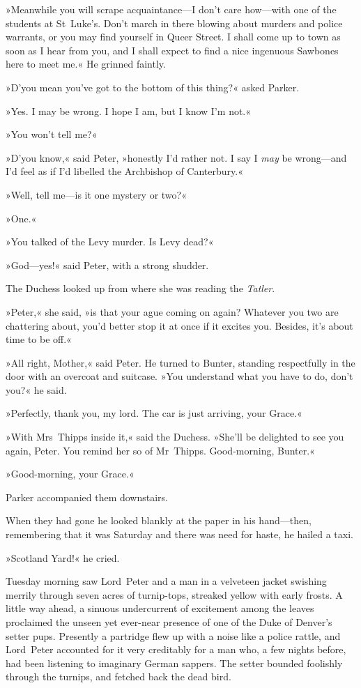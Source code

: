 »Meanwhile you will scrape acquaintance—I don't care how—with one of the students at St~Luke's. Don't march in there blowing about murders and police warrants, or you may find yourself in Queer Street. I shall come up to town as soon as I hear from you, and I shall expect to find a nice ingenuous Sawbones here to meet me.« He grinned faintly.

»D'you mean you've got to the bottom of this thing?« asked Parker.

»Yes. I may be wrong. I hope I am, but I know I'm not.«

»You won't tell me?«

»D'you know,« said Peter, »honestly I'd rather not. I say I \textit{may} be wrong—and I'd feel as if I'd libelled the Archbishop of Canterbury.«

»Well, tell me—is it one mystery or two?«

»One.«

»You talked of the Levy murder. Is Levy dead?«

»God—yes!« said Peter, with a strong shudder.

The Duchess looked up from where she was reading the \textit{Tatler}.

»Peter,« she said, »is that your ague coming on again? Whatever you two are chattering about, you'd better stop it at once if it excites you. Besides, it's about time to be off.«

»All right, Mother,« said Peter. He turned to Bunter, standing respectfully in the door with an overcoat and suitcase. »You understand what you have to do, don't you?« he said.

»Perfectly, thank you, my lord. The car is just arriving, your Grace.«

»With Mrs~Thipps inside it,« said the Duchess. »She'll be delighted to see you again, Peter. You remind her so of Mr~Thipps. Good-morning, Bunter.«

»Good-morning, your Grace.«

Parker accompanied them downstairs.

When they had gone he looked blankly at the paper in his hand—then, remembering that it was Saturday and there was need for haste, he hailed a taxi.

»Scotland Yard!« he cried.

Tuesday morning saw Lord~Peter and a man in a velveteen jacket swishing merrily through seven acres of turnip-tops, streaked yellow with early frosts. A little way ahead, a sinuous undercurrent of excitement among the leaves proclaimed the unseen yet ever-near presence of one of the Duke of Denver's setter pups. Presently a partridge flew up with a noise like a police rattle, and Lord~Peter accounted for it very creditably for a man who, a few nights before, had been listening to imaginary German sappers. The setter bounded foolishly through the turnips, and fetched back the dead bird.


